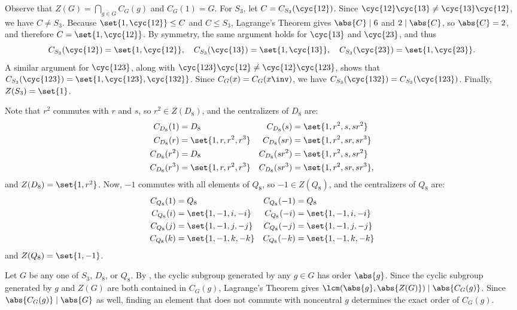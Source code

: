 \begin{sol}
    Observe that $Z(G) = \bigcap_{g \in G} C_G(g)$ and $C_G(1) = G$.
	For $S_3$, let $C = C_{S_3}(\cyc{1 2})$.
    Since $\cyc{1 2}\cyc{1 3} \neq \cyc{1 3}\cyc{1 2}$, we have $C \neq S_3$.
    Because $\set{1, \cyc{1 2}} \leq C$ and $C \leq S_3$, Lagrange's Theorem gives $\abs{C} \mid 6$ and $2 \mid \abs{C}$, so $\abs{C} = 2$, and therefore $C = \set{1, \cyc{1 2}}$.
	By symmetry, the same argument holds for $\cyc{1 3}$ and $\cyc{2 3}$, and thus
    \[
        C_{S_3}(\cyc{1 2}) = \set{1, \cyc{1 2}}, \quad 
    	C_{S_3}(\cyc{1 3}) = \set{1, \cyc{1 3}}, \quad 
        C_{S_3}(\cyc{2 3}) = \set{1, \cyc{2 3}}.
    \]
    A similar argument for $\cyc{1 2 3}$, along with $\cyc{1 2 3}\cyc{1 2} \neq \cyc{1 2}\cyc{1 2 3}$, shows that $C_{S_3}(\cyc{1 2 3}) = \set{1, \cyc{1 2 3}, \cyc{1 3 2}}$.
    Since $C_G(x) = C_G(x\inv)$, we have $C_{S_3}(\cyc{1 3 2}) = C_{S_3}(\cyc{1 2 3})$.
    Finally, $Z(S_3) = \set{1}$.
    
    Note that $r^2$ commutes with $r$ and $s$, so $r^2 \in Z(D_8)$, and the centralizers of $D_8$ are:
    \begin{align*}
        C_{D_8}(1) &= D_8 & C_{D_8}(s) &= \set{1, r^2, s, sr^2} \\
        C_{D_8}(r) &= \set{1, r, r^2, r^3} & C_{D_8}(sr) &= \set{1, r^2, sr, sr^3} \\
        C_{D_8}(r^2) &= D_8 & C_{D_8}(sr^2) &= \set{1, r^2, s, sr^2} \\
        C_{D_8}(r^3) &= \set{1, r, r^2, r^3} & C_{D_8}(sr^3) &= \set{1, r^2, sr, sr^3},
    \end{align*}
    and $Z(D_8) = \set{1, r^2}$.
	Now, $-1$ commutes with all elements of $Q_8$, so $-1 \in Z(Q_8)$, and the centralizers of $Q_8$ are:
    \begin{align*}
        C_{Q_8}(1) & = Q_8 & C_{Q_8}(-1) & = Q_8 \\
        C_{Q_8}(i) & = \set{1, -1, i, -i} & C_{Q_8}(-i) & = \set{1, -1, i, -i} \\
        C_{Q_8}(j) & = \set{1, -1, j, -j} & C_{Q_8}(-j) & = \set{1, -1, j, -j} \\
        C_{Q_8}(k) & = \set{1, -1, k, -k} & C_{Q_8}(-k) & = \set{1, -1, k, -k}
    \end{align*}
    and $Z(Q_8) = \set{1, -1}$.

    Let $G$ be any one of $S_3$, $D_8$, or $Q_8$.
    By , the cyclic subgroup generated by any $g \in G$ has order $\abs{g}$.
    Since the cyclic subgroup generated by $g$ and $Z(G)$ are both contained in $C_G(g)$, Lagrange's Theorem gives $\lcm(\abs{g}, \abs{Z(G)}) \mid \abs{C_G(g)}$.
    Since $\abs{C_G(g)} \mid \abs{G}$ as well, finding an element that does not commute with noncentral $g$ determines the exact order of $C_G(g)$.
\end{sol}

